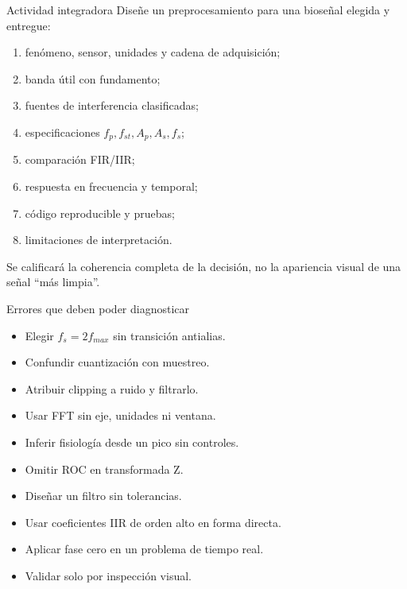 \documentclass[
  ignorenonframetext,
  aspectratio=169,
  spanish,
  professionalfonts]{beamer}
\providecommand{\tightlist}{%
  \setlength{\itemsep}{0pt}\setlength{\parskip}{0pt}}
\begin{document}
\begin{frame}{Actividad integradora}
\protect{}\label{actividad-integradora}
Diseñe un preprocesamiento para una bioseñal elegida y entregue:

\begin{enumerate}
\tightlist
\item
  fenómeno, sensor, unidades y cadena de adquisición;
\item
  banda útil con fundamento;
\item
  fuentes de interferencia clasificadas;
\item
  especificaciones \(f_p,f_{st},A_p,A_s,f_s\);
\item
  comparación FIR/IIR;
\item
  respuesta en frecuencia y temporal;
\item
  código reproducible y pruebas;
\item
  limitaciones de interpretación.
\end{enumerate}

\begin{tcolorbox}[enhanced jigsaw, arc=.35mm, bottomrule=.15mm, bottomtitle=1mm, breakable, colback=white, colbacktitle=quarto-callout-important-color!10!white, colframe=quarto-callout-important-color-frame, coltitle=black, left=2mm, leftrule=.75mm, opacityback=0, opacitybacktitle=0.6, rightrule=.15mm, title={Criterio de evaluación}, titlerule=0mm, toprule=.15mm, toptitle=1mm]

Se calificará la coherencia completa de la decisión, no la apariencia
visual de una señal ``más limpia''.

\end{tcolorbox}
\end{frame}

\begin{frame}{Errores que deben poder diagnosticar}
\protect{}\label{errores-que-deben-poder-diagnosticar}
\begin{itemize}
\tightlist
\item
  Elegir \(f_s=2f_{max}\) sin transición antialias.
\item
  Confundir cuantización con muestreo.
\item
  Atribuir clipping a ruido y filtrarlo.
\item
  Usar FFT sin eje, unidades ni ventana.
\item
  Inferir fisiología desde un pico sin controles.
\item
  Omitir ROC en transformada Z.
\item
  Diseñar un filtro sin tolerancias.
\item
  Usar coeficientes IIR de orden alto en forma directa.
\item
  Aplicar fase cero en un problema de tiempo real.
\item
  Validar solo por inspección visual.
\end{itemize}
\end{frame}
\end{document}
